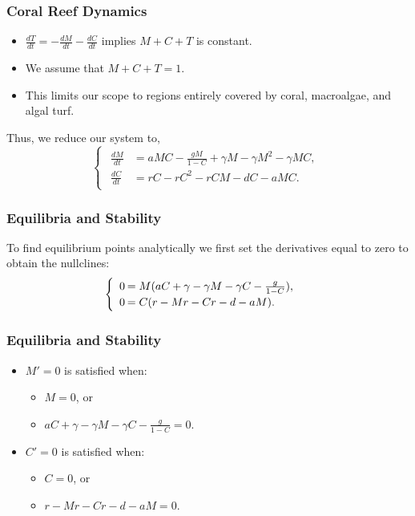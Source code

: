 \begin{frame}\frametitle{Coral Reef Dynamics}

\hspace{1.57em}

\begin{itemize}
\item $\frac{dT}{dt}=-\frac{dM}{dt}-\frac{dC}{dt}$ implies $M+C+T$ is
  constant.
\item We assume that $M+C+T=1$.
\item This limits our scope to regions entirely covered by coral,
  macroalgae, and algal turf. 
\end{itemize}

Thus, we reduce our system to, 
$$\begin{cases}
\begin{array}{rl}
\frac{dM}{dt}&= aMC-\frac{gM}{1-C} + \gamma M - \gamma M^2 -\gamma M C,\\
\frac{dC}{dt}&=rC - rC^2 - rCM - dC - aMC.
\end{array} 
\end{cases}$$
\end{frame}

\begin{frame}\frametitle{Equilibria and Stability}
To find equilibrium points analytically we first set the derivatives equal to zero to obtain the nullclines:
$$\begin{cases}
\begin{array}{rl}
0\hspace{-.8em}&=M(aC + \gamma-\gamma M-\gamma C - \frac{g}{1-C}),\\
0\hspace{-.8em}&=C(r-Mr-Cr - d - aM).
\end{array}
\end{cases}$$
\end{frame}



\begin{frame}\frametitle{Equilibria and Stability}

  \begin{itemize}
  \item $M'=0$ is satisfied when:
    \begin{itemize}
    \item $M=0$, or 
    \item
      $aC + \gamma - \gamma M - \gamma C -
      \frac{g}{1-C}=0$.
    \end{itemize}
  \item $C'=0$ is satisfied when:
    \begin{itemize} 
    \item$C=0$, or 
    \item $r-Mr-Cr-d-aM=0$. 
    \end{itemize}
  \end{itemize}

\end{frame}


